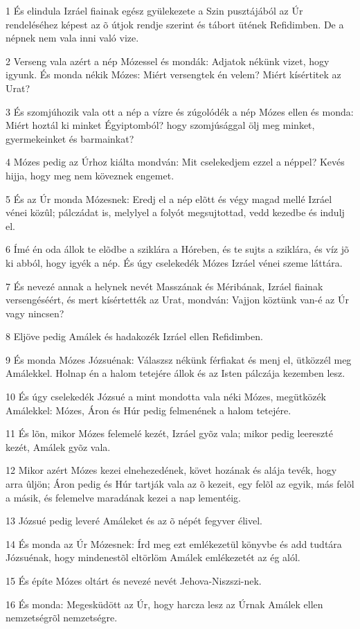 \par 1 És elindula Izráel fiainak egész gyülekezete a Szin pusztájából az Úr rendeléséhez képest az õ útjok rendje szerint és tábort ütének Refidimben. De a népnek nem vala inni való vize.
\par 2 Verseng vala azért a nép Mózessel és mondák: Adjatok nékünk vizet, hogy igyunk. És monda nékik Mózes: Miért versengtek én velem? Miért kísértitek az Urat?
\par 3 És szomjúhozik vala ott a nép a vízre és zúgolódék a nép Mózes ellen és monda: Miért hoztál ki minket Égyiptomból? hogy szomjúsággal ölj meg minket, gyermekeinket és barmainkat?
\par 4 Mózes pedig az Úrhoz kiálta mondván: Mit cselekedjem ezzel a néppel? Kevés hijja, hogy meg nem köveznek engemet.
\par 5 És az Úr monda Mózesnek: Eredj el a nép elõtt és végy magad mellé Izráel vénei közûl; pálczádat is, melylyel a folyót  megsujtottad, vedd kezedbe és indulj el.
\par 6 Ímé én oda állok te elõdbe a sziklára a Hóreben, és te sujts a sziklára, és víz jõ ki abból, hogy igyék a nép. És úgy cselekedék Mózes Izráel vénei szeme láttára.
\par 7 És nevezé annak a helynek nevét Masszának és Méribának, Izráel fiainak versengéséért, és mert kísértették az Urat, mondván: Vajjon köztünk van-é az Úr vagy nincsen?
\par 8 Eljöve pedig Amálek és hadakozék Izráel ellen Refidimben.
\par 9 És monda Mózes Józsuénak: Válaszsz nékünk férfiakat és menj el, ütközzél meg Amálekkel. Holnap én a halom tetejére állok és az Isten pálczája kezemben lesz.
\par 10 És úgy cselekedék Józsué a mint mondotta vala néki Mózes, megütközék Amálekkel: Mózes, Áron és Húr pedig felmenének a halom tetejére.
\par 11 És lõn, mikor Mózes felemelé kezét, Izráel gyõz vala; mikor pedig leereszté kezét, Amálek gyõz vala.
\par 12 Mikor azért Mózes kezei elnehezedének, követ hozának és alája tevék, hogy arra ûljön; Áron pedig és Húr tartják vala az õ kezeit, egy felõl az egyik, más felõl a másik, és felemelve maradának kezei a nap lementéig.
\par 13 Józsué pedig leveré Amáleket és az õ népét fegyver élivel.
\par 14 És monda az Úr Mózesnek: Írd meg ezt emlékezetül könyvbe és add tudtára Józsuénak, hogy mindenestõl eltörlöm Amálek  emlékezetét az ég alól.
\par 15 És építe Mózes oltárt és nevezé nevét Jehova-Niszszi-nek.
\par 16 És monda: Megesküdött az Úr, hogy harcza lesz az Úrnak Amálek ellen nemzetségrõl nemzetségre.

